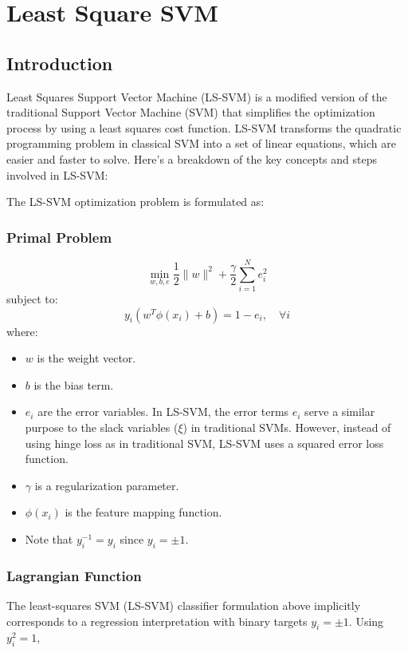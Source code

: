 \chapter{Least Square SVM}
\label{ch:ls_svm}

\section{Introduction}
\label{sec:ls_svm}
Least Squares Support Vector Machine (LS-SVM) is a modified version of the traditional Support Vector Machine (SVM) that simplifies the optimization process by using a least squares cost function. LS-SVM transforms the quadratic programming problem in classical SVM into a set of linear equations, which are easier and faster to solve. Here’s a breakdown of the key concepts and steps involved in LS-SVM:

The LS-SVM optimization problem is formulated as:

\subsection{Primal Problem}

   \[
   \min_{w, b, e} \frac{1}{2} \|w\|^2 + \frac{\gamma}{2} \sum_{i=1}^N e_i^2
   \]
   subject to:
   \[
   y_i (w^T \phi(x_i) + b) = 1 - e_i, \quad \forall i \]
   where:
   \begin{itemize}
	   \item \( w \) is the weight vector.
   	   \item \( b \) is the bias term.
   	   \item \( e_i \) are the error variables. In LS-SVM, the error terms $e_i$ serve a similar purpose to the slack variables ($\xi$) in traditional SVMs. However, instead of using hinge loss as in traditional SVM, LS-SVM uses a squared error loss function. 
   	   \item \( \gamma \) is a regularization parameter.
   	   \item \( \phi(x_i) \) is the feature mapping function.
	   \item Note that $y_i^{-1} = y_i$ since $y_i = \pm 1$. 
   \end{itemize}

\subsection{Lagrangian Function}
The least-squares SVM (LS-SVM) classifier formulation above implicitly corresponds to a regression interpretation with binary targets $y_i=\pm 1$. Using $y_i^2=1$,

